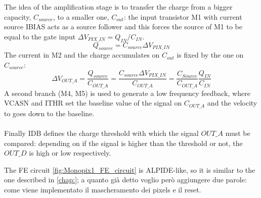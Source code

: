       The idea of the amplification stage is to transfer the charge from a bigger capacity\cite{ALPIDE-FE}, $C_{source}$, to a smaller one, $C_{out}$: the input transistor M1 with current source IBIAS acts as a source follower and this forces the source of M1 to be equal to the gate input  $\Delta V_{PIX\_IN} = Q_{IN}/C_{IN}$.
      \begin{equation}
         Q_{source} = C_{source} \Delta V_{PIX\_IN}
      \end{equation}
      The current in M2 and the charge accumulates on $C_{out}$ is fixed by the one on $C_{source}$:
      \begin{equation}
         \Delta V_{OUT\_A} = \frac{Q_{source}}{C_{OUT\_A}} = \frac{C_{source}\Delta V_{PIX\_IN}}{C_{OUT\_A}}  = \frac{C_{Source}}{C_{OUT\_A}}\frac{Q_{IN}}{C_{IN}}
      \end{equation}
      A second branch (M4, M5) is used to generate a low frequency feedback, where VCASN and ITHR set the baseline value of the signal on $C_{OUT\_A}$ and the velocity to goes down to the baseline.\\
      \\
      Finally IDB defines the charge threshold with which the signal $OUT\_A$ must be compared: depending on if the signal is higher than the threshold or not, the $OUT\_D$ is high or low respectively.

    The FE circuit \ref{fig:Monopix1_FE_circuit} is ALPIDE-like, so it is similar to the one described in \ref{chap:}; a quanto già detto voglio però aggiungere due parole: come viene implementato il mascheramento dei pixels e il reset.\\ 

